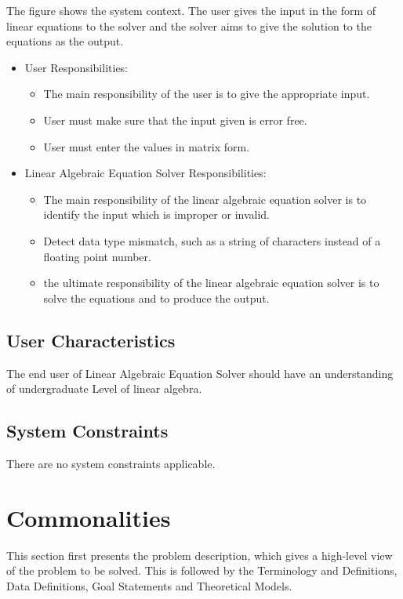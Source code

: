 \documentclass[12pt]{article}
\newcommand{\progname}{Linear Algebraic Equation Solver} %
\begin{document}
The figure shows the system context. The user gives the input in the form of
linear equations to the solver and the solver aims to give the solution to the
equations as the output.



\begin{itemize}
\item User Responsibilities:
\begin{itemize}
\item The main responsibility of the user is to give the appropriate input.
\item User must make sure that the input given is error free.
\item User must enter the values in matrix form.
\end{itemize}
\item \progname{} Responsibilities:
\begin{itemize}
\item The main responsibility of the linear algebraic equation solver is to
identify the input which is improper or invalid.
\item Detect data type mismatch, such as a string of characters instead of a
  floating point number.
\item the ultimate responsibility of the linear algebraic equation solver is to
solve the equations and to produce the output.
\end{itemize}
\end{itemize}

\subsection{User Characteristics} \label{SecUserCharacteristics}

The end user of \progname{} should have an understanding of undergraduate Level
of linear algebra.

\subsection{System Constraints}

There are no system constraints applicable.

\section{Commonalities}

This section first presents the problem description, which gives a high-level
view of the problem to be solved. This is followed by the Terminology and
Definitions, Data Definitions, Goal Statements and Theoretical Models.
\end{document}
